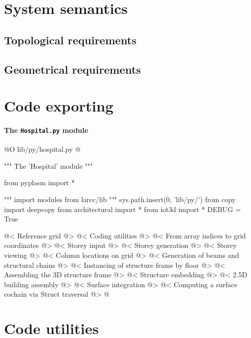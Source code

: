 \documentclass[11pt,oneside]{article}    %
\begin{document}
\section{System semantics}

\subsection{Topological requirements}

\subsection{Geometrical requirements}


\section{Code exporting}

\paragraph{The \texttt{Hospital.py} module}
@O lib/py/hospital.py
@{""" The 'Hospital' module """

from pyplasm import *

""" import modules from larcc/lib """
sys.path.insert(0, 'lib/py/')
from copy import deepcopy
from architectural import *
from iot3d import *
DEBUG = True

@< Reference grid @>
@< Coding utilities @>
@< From array indices to grid coordinates @>
@< Storey input @>
@< Storey generation @>
@< Storey viewing @>
@< Column locations on grid @>
@< Generation of beams and structural chains @>
@< Instancing of structure frame by floor @>
@< Assembling the 3D structure frame @>
@< Structure embedding @>
@< 2.5D building assembly @>
@< Surface integration @>
@< Computing a surface cochain via Struct traversal @>
@}


\appendix
\section{Code utilities}
\end{document}
